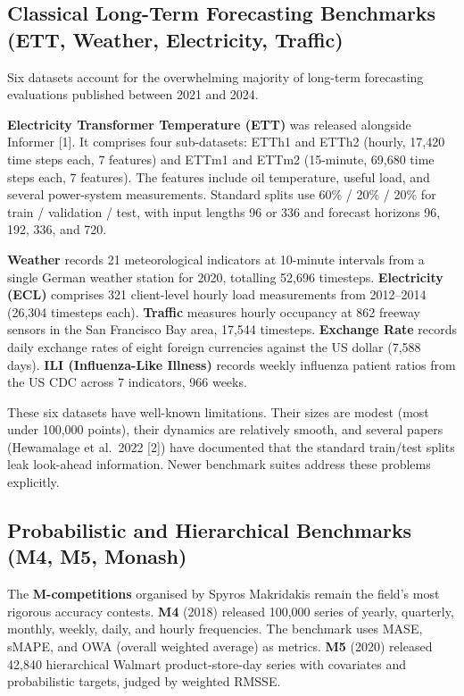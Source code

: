 \documentclass{article}
\begin{document}
\subsection{Classical Long-Term Forecasting Benchmarks (ETT, Weather, Electricity, Traffic)}\label{classical-long-term-forecasting-benchmarks-ett-weather-electricity-traffic}

Six datasets account for the overwhelming majority of long-term forecasting evaluations published between 2021 and 2024.

\textbf{Electricity Transformer Temperature (ETT)} was released alongside Informer \citep{zhou2021informerbeyondeffi} {[}1{]}. It comprises four sub-datasets: ETTh1 and ETTh2 (hourly, 17,420 time steps each, 7 features) and ETTm1 and ETTm2 (15-minute, 69,680 time steps each, 7 features). The features include oil temperature, useful load, and several power-system measurements. Standard splits use 60\% / 20\% / 20\% for train / validation / test, with input lengths 96 or 336 and forecast horizons 96, 192, 336, and 720.

\textbf{Weather} records 21 meteorological indicators at 10-minute intervals from a single German weather station for 2020, totalling 52,696 timesteps. \textbf{Electricity (ECL)} comprises 321 client-level hourly load measurements from 2012--2014 (26,304 timesteps each). \textbf{Traffic} measures hourly occupancy at 862 freeway sensors in the San Francisco Bay area, 17,544 timesteps. \textbf{Exchange Rate} records daily exchange rates of eight foreign currencies against the US dollar (7,588 days). \textbf{ILI (Influenza-Like Illness)} records weekly influenza patient ratios from the US CDC across 7 indicators, 966 weeks.

These six datasets have well-known limitations. Their sizes are modest (most under 100,000 points), their dynamics are relatively smooth, and several papers (Hewamalage et al.~2022 {[}2{]}) have documented that the standard train/test splits leak look-ahead information. Newer benchmark suites address these problems explicitly.

\subsection{Probabilistic and Hierarchical Benchmarks (M4, M5, Monash)}\label{probabilistic-and-hierarchical-benchmarks-m4-m5-monash}

The \textbf{M-competitions} organised by Spyros Makridakis remain the field's most rigorous accuracy contests. \textbf{M4} (2018) released 100,000 series of yearly, quarterly, monthly, weekly, daily, and hourly frequencies. The benchmark uses MASE, sMAPE, and OWA (overall weighted average) as metrics. \textbf{M5} (2020) released 42,840 hierarchical Walmart product-store-day series with covariates and probabilistic targets, judged by weighted RMSSE.
\end{document}
